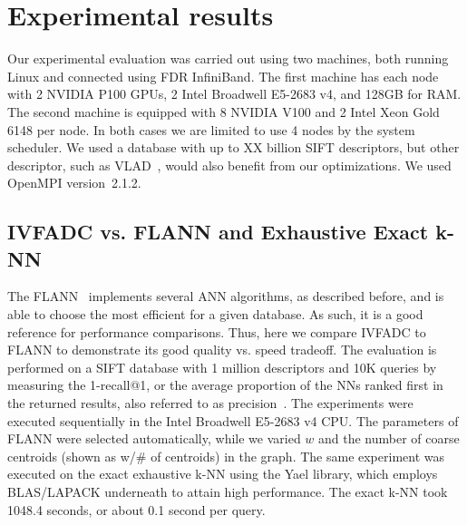 \section{Experimental results}
\label{sec:experimental-results}

Our experimental evaluation was carried out using two machines, both running Linux and connected
using FDR InfiniBand. The first machine has each node
with 2 NVIDIA P100 GPUs, 2 Intel Broadwell E5-2683 v4, and 128GB for RAM. The second machine is 
equipped with 8 NVIDIA V100 and 2 Intel Xeon Gold 6148 per node. In 
both cases we are limited to use 4 nodes by the system scheduler. We used a database 
with up to XX billion SIFT descriptors, but
other descriptor, such as VLAD~\cite{jegou2010aggregating}, would also benefit from our optimizations. We used
OpenMPI version~2.1.2.

\subsection{IVFADC vs. FLANN and Exhaustive Exact k-NN}

The FLANN~\cite{Muja2009331, 6809191} implements several ANN algorithms, as described before,
and is able to choose the most efficient for a given database. As such, it is a good reference
for performance comparisons. Thus, here we compare IVFADC to FLANN to demonstrate its good quality
vs. speed tradeoff. The evaluation is performed on a SIFT database with 1 million descriptors and
10K queries by measuring the 1-recall@1, or the average proportion of the NNs ranked first in
the returned results, also referred to as precision~\cite{Muja2009331}. The experiments were
executed sequentially in the Intel Broadwell E5-2683 v4 CPU. The parameters of FLANN were
selected automatically, while we varied $w$ and the number of coarse centroids (shown as 
w/\# of centroids) in the graph. The same experiment was executed on the exact exhaustive k-NN  
using the Yael library, which employs BLAS/LAPACK underneath to attain high performance.
The exact k-NN took 1048.4 seconds, or about 0.1 second per query.



